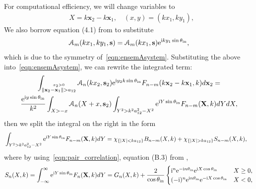 \documentclass[12pt, a4paper]{article}
\begin{document}
For computational efficiency, we will change variables to
\begin{align}
& X = k\mathbf x_2 - k\mathbf x_1, \quad (x,y) = (kx_1,ky_1),
\end{align}
We also borrow equation (4.1) from \parencite{gower_reflection_2018} to substitute
\begin{equation}
  \mathcal A_m (k x_1, k y_1, \mathbf s) = \mathcal A_m (k x_1, \mathbf s) \textrm{e}^{\textrm{i} k y_1 \sin\theta_{\mathrm{in}}},
  \label{eqn:A_symmetry}
\end{equation}
which is due to the symmetry of~\eqref{eqn:ensemAsystem}. Substituting the above into~\eqref{eqn:ensemAsystem}, we can rewrite the integrated term:
\begin{multline*}
     \int_{\stackrel{x_2 > 0 }{\|\mathbf x_2-\mathbf x_1 \| > a_{12}}} \mathcal A_n (k x_2, \mathbf s_2) \textrm{e}^{\textrm{i} y_2 k \sin\theta_{\mathrm{in}}} F_{n-m}(k\mathbf x_2 - k \mathbf x_1,k) d \mathbf x_2 =
  \\
   \frac{\textrm{e}^{\textrm{i} y \sin\theta_{\mathrm{in}}}}{k^2} \int_{X> -x} \mathcal A_n (X + x, \mathbf s_2) \int_{Y^2 > k^2 a_{12}^2 - X^2}
   \textrm{e}^{\textrm{i} Y \sin\theta_{\mathrm{in}}} F_{n-m}(\mathbf X,k) d Y d X,
\end{multline*}
then we split the integral on the right in the form
\begin{align*}
  &\int_{Y^2 > k^2 a_{12}^2 - X^2} \ee^{\ii Y \sin\theta_\inc} F_{n-m}(\mathbf X,k) d Y
 = \chi_{\{ |X|< k a_{12}\}} B_{n-m}(X,k)
   +  \chi_{\{ |X|> k a_{12}\}}S_{n-m}(X,k),
\end{align*}
where by using~\eqref{eqn:pair_correlation}, equation (B.3) from \cite{gower_reflection_2018},
\begin{equation}
  S_n(X,k) =  \int_{-\infty}^\infty \textrm{e}^{\textrm{i} Y \sin\theta_{\mathrm{in}}}
  F_{n}(\mathbf X,k) d Y =
G_{n}(X, k) +
\frac{2}{\cos \theta_{\mathrm{in}}}
\begin{cases}
  \textrm{i}^{n} \textrm{e}^{-\textrm{i} n \theta_{\mathrm{in}}} \textrm{e}^{\textrm{i} X \cos \theta_{\mathrm{in}} } & X \geq 0,\\
  (-\textrm{i})^{n} \textrm{e}^{\textrm{i} n \theta_{\mathrm{in}}} \textrm{e}^{-\textrm{i} X \cos \theta_{\mathrm{in}} } & X < 0,
\end{cases}
  \label{eqn:Sn}
\end{equation}
\end{document}
